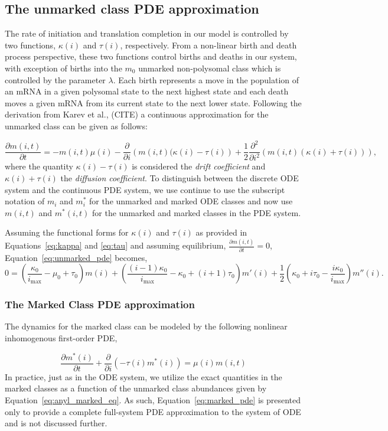 \documentclass[review]{elsarticle}
\newcommand{\imax}{\ensuremath{i_{\max}}\xspace}
\newcommand\p[2]{\frac{\partial #1}{\partial #2}}
\newcommand\ptwo[2]{\frac{\partial^2 #1}{\partial #2^2}}
\begin{document}
\subsection{The unmarked class PDE approximation}
The rate of initiation and translation completion in our model is controlled by two functions, $\kappa(i)$ and $\tau(i)$, respectively.
From a non-linear birth and death process perspective, these two functions control births and deaths in our system, with exception of births into the $m_0$ unmarked non-polysomal class which is controlled by the parameter $\lambda$.
Each birth represents a move in the population of an mRNA in a given polysomal state to the next highest state and each death moves a given mRNA from its current state to the next lower state.
Following the derivation from Karev et al., (CITE) a continuous approximation for the unmarked class can be given as follows:

\begin{equation}\label{eq:unmarked_pde}
\p{m(i,t)}{t}=-m(i,t)\mu(i)-\p{}{i}\left(m(i,t)(\kappa(i)-\tau(i)\right)+\frac{1}{2}\ptwo{}{i}\left(m(i,t)(\kappa(i)+\tau(i))\right),
\end{equation} where the quantity $\kappa(i)-\tau(i)$ is considered the \emph{drift coefficient} and $\kappa(i)+\tau(i)$ the \emph{diffusion coefficient}.
To distinguish between the discrete ODE system and the continuous PDE system, we use continue to use the subscript notation of $m_i$ and $m_i^*$ for the unmarked and marked ODE classes and now use $m(i,t)$ and $m^*(i,t)$ for the unmarked and marked classes in the PDE system.

Assuming the functional forms for $\kappa(i)$ and $\tau(i)$ as provided in Equations~\ref{eq:kappa} and \ref{eq:tau} and assuming equilibrium, $\p{m(i,t)}{t}=0$, Equation~\ref{eq:unmarked_pde} becomes,
\begin{equation}
0=\left(\frac{\kappa_0}{\imax}-\mu_0+\tau_0\right)m(i)+\left(\frac{(i-1)\kappa_0}{\imax}-\kappa_0+(i+1)\tau_0\right)m'(i)+\frac{1}{2}\left(\kappa_0+i\tau_0-\frac{i\kappa_0}{\imax}\right)m''(i).
\end{equation}
\subsubsection{The Marked Class PDE approximation}
The dynamics for the marked class can be modeled by the following nonlinear inhomogenous first-order PDE,

\begin{equation}\label{eq:marked_pde}
\frac{\partial m^*(i)}{\partial t}+\frac{\partial}{\partial i}\left(-\tau(i)m^*(i)\right)=\mu(i)m(i,t)
\end{equation}
In practice, just as in the ODE system, we utilize the exact quantities in the marked classes as a function of the unmarked class abundances given by Equation~\ref{eq:anyl_marked_eq}.
As such, Equation~\ref{eq:marked_pde} is presented only to provide a complete full-system PDE approximation to the system of ODE and is not discussed further.
\end{document}
